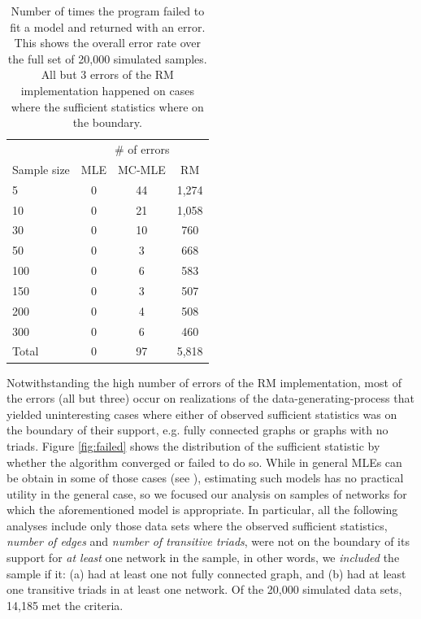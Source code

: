\documentclass[review, nonatbib,doubleblind]{elsarticle/elsarticle}
\begin{document}
\begin{table}[ht]
\centering
\begin{tabular}{lccc}
\toprule & \multicolumn{3}{c}{\# of errors} \\ \cmidrule(r){2-4}
Sample size & MLE & MC-MLE & RM \\ 
  \midrule
5 &   0 &  44 & 1,274 \\ 
  10 &   0 &  21 & 1,058 \\ 
  30 &   0 &  10 & 760 \\ 
  50 &   0 &   3 & 668 \\ 
  100 &   0 &   6 & 583 \\ 
  150 &   0 &   3 & 507 \\ 
  200 &   0 &   4 & 508 \\ 
  300 &   0 &   6 & 460 \\ 
  \midrule Total &   0 &  97 & 5,818 \\ 
   \bottomrule
\end{tabular}
\caption{\label{tab:error-sampsize}Number of times the program failed to fit a model and returned with an error. This shows the overall error rate over the full set of 20,000 simulated samples. All but 3 errors of the RM implementation happened on cases where the sufficient statistics where on the boundary.} 
\end{table}


Notwithstanding the high number of errors of the RM implementation, most of the errors (all but three) occur on realizations of the data-generating-process that yielded uninteresting cases where either of observed sufficient statistics was on the boundary of their support, e.g. fully connected graphs or graphs with no triads. Figure \ref{fig:failed} shows the distribution of the sufficient statistic by whether the algorithm converged or failed to do so. While in general MLEs can be obtain in some of those cases (see \cite{Handcock2003}), estimating such models has no practical utility in the general case, so we focused our analysis on samples of networks for which the aforementioned model is appropriate. In particular, all the following analyses include only those data sets where the observed sufficient statistics, \textit{number of edges} and \textit{number of transitive triads}, were not on the boundary of its support for \textit{at least} one network in the sample, in other words, we \textit{included} the sample if it: (a) had at least one not fully connected graph, and (b) had at least one transitive triads in at least one network. Of the 20,000 simulated data sets, 14,185 met the criteria. 
\end{document}
